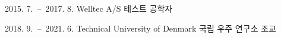 \documentclass[master,english,final,pdfdoc]{kaist-ucs}
\begin{document}
	\begin{career}
		\item[2015. 7.\ --\ 2017. 8.] Welltec A/S 테스트 공학자
		\item[2018. 9.\ --\ 2021. 6.] Technical University of Denmark 국립 우주 연구소 조교
	\end{career}



	\appendix
	

	\label{paperlastpagelabel}     %
\end{document}
